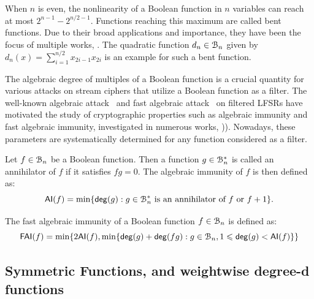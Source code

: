\documentclass[11pt]{llncs}
\begin{document}
When $n$ is even, the nonlinearity of a Boolean function in $n$ variables can reach at most $2^{n-1}-2^{n/2 -1}$. Functions reaching this maximum are called bent functions. Due to their broad applications and importance, they have been the focus of multiple works, \eg{} \cite{Rothaus76,FSE:Dobbertin95,DBLP:conf/itw/BudaghyanCH11,Tokareva15,Mesnager16}. 
The quadratic function $d_n\in\mathcal{B}_n$ given by $d_n(x)=\sum_{i=1}^{n/2}x_{2i-1}x_{2i}$ is an example for such a bent function.

\bigskip
The algebraic degree of multiples of a Boolean function is a crucial quantity for various attacks on stream ciphers that utilize a Boolean function as a filter. 
The well-known algebraic attack~\cite{EC:CouMei03} and fast algebraic attack~\cite{C:Courtois03} on filtered \textsf{LFSR}s have motivated the study of cryptographic properties such as algebraic immunity and fast algebraic immunity, investigated in numerous works, \eg{} \cite{FSE:Armknecht04,C:HawRos04,ISC:JiaZhaWan13})). Nowadays, these parameters are systematically determined for any function considered as a filter.

\begin{definition} \label{def:ai}
	Let $f\in\mathcal{B}_n$ be a Boolean function. Then a function $g\in\mathcal{B}_n^*$ is called an annihilator of $f$ if it satisfies $fg=0$. The algebraic immunity of $f$ is then defined as:
	\[ \mathsf{AI}(f) = \min\{ \mathsf{deg}(g):\text{$g\in\mathcal{B}_n^*$ is an annihilator of $f$ or $f+1$}\}.\]
\end{definition}



\begin{definition}\label{def:FAI} The fast algebraic immunity of a Boolean function $f\in \mathcal{B}_{n}$ is defined as:
\[
    \mathsf{FAI}(f)=\min \{ 2 \mathsf{AI}(f), \min\{\mathsf{deg}(g)+ \mathsf{deg}(fg):g\in\mathcal{B}_n,1\leqslant\mathsf{deg}(g)<\mathsf{AI}(f)\}\}
\]

\end{definition}

\subsection{Symmetric Functions, \hwbf{} and weightwise degree-d functions}
\end{document}
